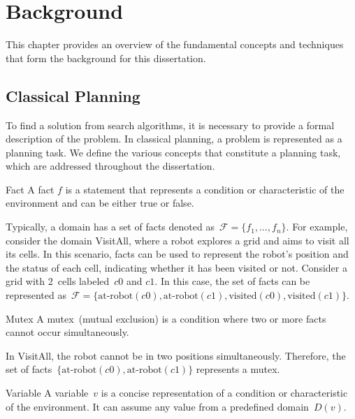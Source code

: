 \chapter{Background}
\label{sec:background}

This chapter provides an overview of the fundamental concepts and techniques that form the background for this dissertation.

\section{Classical Planning}
\label{sec:classical-planning}

To find a solution from search algorithms, it is necessary to provide a formal description of the problem. In classical planning, a problem is represented as a planning task. We define the various concepts that constitute a planning task, which are addressed throughout the dissertation.

\begin{definition}{Fact}
    \label{def:fact}
    A fact $f$ is a statement that represents a condition or characteristic of the environment and can be either true or false.
\end{definition}

Typically, a domain has a set of facts denoted as~$\mathcal{F} = \{f_1, \ldots, f_n\}$. For example, consider the domain VisitAll, where a robot explores a grid and aims to visit all its cells. In this scenario, facts can be used to represent the robot's position and the status of each cell, indicating whether it has been visited or not. Consider a grid with 2~cells labeled~$c0$ and $c1$. In this case, the set of facts can be represented as~$\mathcal{F} = \{\text{at-robot}(c0),\text{at-robot}(c1),\text{visited}(c0),\text{visited}(c1)\}$.

\begin{definition}{Mutex}
    \label{def:mutex}
    A mutex~(mutual exclusion) is a condition where two or more facts cannot occur simultaneously.
\end{definition}

In VisitAll, the robot cannot be in two positions simultaneously. Therefore, the set of facts~$\{\text{at-robot}(c0),\text{at-robot}(c1)\}$ represents a mutex.

\begin{definition}{Variable}
    \label{def:variable}
    A variable~$v$ is a concise representation of a condition or characteristic of the environment. It can assume any value from a predefined domain~$D(v)$.
\end{definition}

